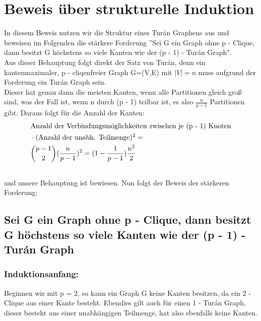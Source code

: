 \documentclass[12pt, a4paper]{article}
\begin{document}
\section{Beweis über strukturelle Induktion}
\label{proof/second:zweiter-beweis-struktur-des-turan-graphs}\label{proof/second::doc}
In diesem Beweis nutzen wir die Struktur eines Turán Graphens aus und beweisen im Folgenden die stärkere Forderung ''Sei G ein Graph ohne p - Clique, dann besitzt G höchstens so viele Kanten wie der (p - 1) - Turán Graph". \\
Aus dieser Behauptung folgt direkt der Satz von Turán, denn ein kantenmaximaler, p - cliqenfreier Graph G=(V,E) mit $\mid V \mid = n$ muss aufgrund der Forderung ein Turán Graph sein. \\
Dieser hat genau dann die meisten Kanten, wenn alle Partitionen gleich groß sind, was der Fall ist, wenn n durch (p - 1) teilbar ist, es also $\frac{n}{p-1}$ Partitionen gibt. Daraus folgt für die Anzahl der Kanten:
\begin{gather}
\begin{split}&\text{Anzahl der Verbindungsmöglichkeiten zwischen je (p - 1) Knoten} \\
&\cdot ( \text{Anzahl der unabh. Teilmenge} )^2 = \\ &{ p - 1 \choose 2 } ( \frac{n}{p-1} )^2 = (1 - \frac{1}{p - 1}) \frac{n^2}{2}\end{split}\notag\\\begin{split}\end{split}\notag
\end{gather}
und unsere Behauptung ist bewiesen. Nun folgt der Beweis der stärkeren Forderung:


\subsection{Sei G ein Graph ohne p - Clique, dann besitzt G höchstens so viele Kanten wie der (p - 1) - Turán Graph}
\label{proof/second:sei-g-ein-graph-ohne-p-clique-dann-besitzt-g-hochstens-so-viele-kanten-wie-der-p-1-turan-graph}
\subsubsection{Induktionsanfang:}

Beginnen wir mit p = 2, so kann ein Graph G keine Kanten besitzen, da ein 2 - Clique aus einer Kante besteht. Ebendies gilt auch für einen 1 - Turán Graph, dieser besteht aus einer unabhängigen Teilmenge, hat also ebenfalls keine Kanten. 
\end{document}
